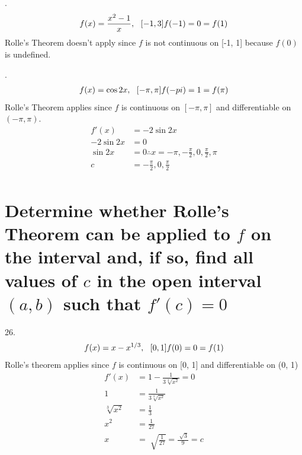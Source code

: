 \documentclass[11pt]{article}
\begin{document}
\vspace{1cm}
.\begin{eqnarray}
    \setcounter{equation}{1}
    f(x)=\frac{x^2-1}{x},\,\,\,\,[-1, 3]
    f(-1)=0=f(1)
\end{eqnarray}
Rolle's Theorem doesn't apply since $f$ is not continuous on [-1, 1] because $f(0)$ is undefined.

\vspace{1cm}
.\begin{eqnarray}
\setcounter{equation}{1}
    f(x)=\cos2x,\,\,\,\,[-\pi, \pi]
    f(-pi)=1=f(\pi)
\end{eqnarray}
Rolle's Theorem applies since $f$ is continuous on $[-\pi, \pi]$ and differentiable on $(-\pi, \pi)$.
\begin{eqnarray}
    f'(x)&=-2\sin2x\\
    -2\sin2x&=0\\
    \sin2x&=0\therefore x=-\pi, -\frac{\pi}{2}, 0, \frac{\pi}{2}, \pi\\
    c&=-\frac{\pi}{2}, 0, \frac{\pi}{2}\\
\end{eqnarray}

\section{Determine whether Rolle's Theorem can be applied to $f$ on the interval and, if so, find all values of $c$ in the open interval $(a, b)$ such that $f'(c)=0$}
26.\begin{eqnarray}
    \setcounter{equation}{1}
    f(x)=x-x^{1/3},\,\,\,\,[0, 1]
    f(0)=0=f(1)
\end{eqnarray}
Rolle's theorem applies since $f$ is continuous on [0, 1] and differentiable on (0, 1)
\begin{eqnarray}
    f'(x)&=1-\frac{1}{3\sqrt[3]{x^2}}=0\\
    1&=\frac{1}{3\sqrt[3]{x^2}}\\
    \sqrt[3]{x^2}&=\frac{1}{3}\\
    x^2&=\frac{1}{27}\\
    x&=\sqrt[]{\frac{1}{27}}=\frac{\sqrt[]{3}}{9}=c
\end{eqnarray}
\end{document}
